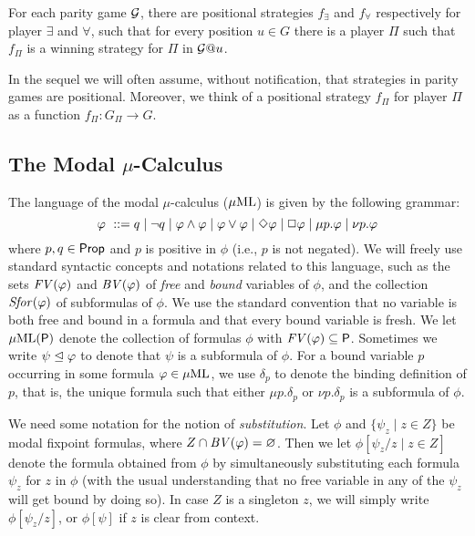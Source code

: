 \begin{fact}
\label{THM_posDet_ParityGames}
For each parity game $\mathcal{G}$, there are positional strategies $f_{\exists}$
and $f_{\forall}$ respectively for player $\exists$ and $\forall$, such that
for every position $u \in G$ there is a player $\Pi$ such that $f_{\Pi}$ is a
winning strategy for $\Pi$ in $\mathcal{G}@u$.
\end{fact}
%
In the sequel we will often assume, without notification, that strategies in
parity games are positional. 
Moreover, we think of a positional strategy $f_\Pi$ for player $\Pi$ as a 
function $f_\Pi:G_\Pi\to G$.

\subsection{The Modal $\mu$-Calculus}
\label{subsec:mu}

The language of the modal $\mu$-calculus ($\mu\mathrm{ML}$) is given by the following 
grammar:
%
\begin{equation*}
    \varphi\ \mathrel{::=}  q \mid \neg q \mid \varphi \land \varphi \mid
    \varphi \lor \varphi \mid  \Diamond \varphi \mid \Box \varphi \mid
    \mu p.\varphi \mid \nu p.\varphi
\end{equation*}
%
where $p,q \in \mathsf{Prop}$ and $p$ is positive in $\phi$ (i.e., $p$ is not
negated).
We will freely use standard syntactic concepts and notations related to this
language, such as the sets $\mathit{FV}(\varphi)$ and $\mathit{BV}(\varphi)$ of \emph{free} and 
\emph{bound} variables of $\phi$, and the collection $\mathit{Sfor}(\varphi)$ of subformulas
of $\phi$.
We use the standard convention that no variable is both free and bound in a
formula and that every bound variable is fresh.
We let $\mu\mathrm{ML}(\mathsf{P})$ denote the collection of formulas $\phi$ with $\mathit{FV}(\varphi)
\subseteq \mathsf{P}$.
Sometimes we write $\psi \trianglelefteq \varphi$ to denote that $\psi$ is a subformula
of $\phi$.
%
For a bound variable $p$ occurring in some formula $\varphi \in \mu\mathrm{ML}$, we use
$\delta_p$ to denote the binding definition of $p$, that is, the unique formula
such that either $\mu p.\delta_p$ or $\nu p.\delta_p$ is a subformula of 
$\phi$.

We need some notation for the notion of \emph{substitution}.
Let $\phi$ and $\{ \psi_{z} \mid z \in Z \}$ be modal fixpoint formulas, where
$Z \cap \mathit{BV}{(\varphi)} = \varnothing$.
Then we let $\phi[\psi_{z}/z \mid z \in Z]$
denote the formula obtained from $\phi$ by simultaneously substituting each
formula $\psi_{z}$ for $z$ in $\phi$ (with the usual understanding that no 
free variable in any of the $\psi_{z}$ will get bound by doing so).
In case $Z$ is a singleton $z$, we will simply write $\phi[\psi_{z}/z]$, or 
$\phi[\psi]$ if $z$ is clear from context.
\smallskip

